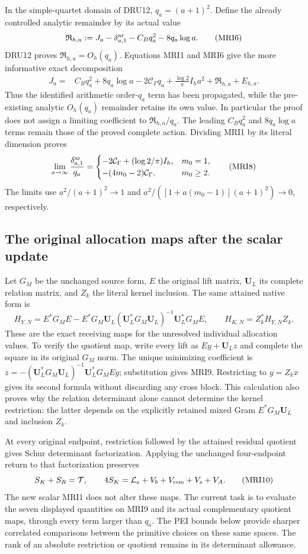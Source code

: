 In the simple-quartet domain of DRU12, $q_a=(a+1)^2$. Define the
already controlled analytic remainder by its actual value
\[
 \mathfrak R_{h,a}:=J_a-\delta_{a,1}^{\rm ar}
                          -C_Bq_a^2-8q_a\log a.
 \tag{MRI6}
\]
DRU12 proves $\mathfrak R_{h,a}=O_h(q_a)$. Equations MRI1 and MRI6
give the more informative exact decomposition
\[
 \begin{split}
 J_a={}&C_Bq_a^2+8q_a\log a-2\mathcal C_\Gamma q_a
        +\frac{\log2}{\pi}I_h a^2+\mathfrak R_{h,a}+E_{h,a}.
 \end{split}\tag{MRI7}
\]
Thus the identified arithmetic order-$q_a$ term has been propagated,
while the pre-existing analytic $O_h(q_a)$ remainder retains its
own value. In particular the proof does not assign a limiting
coefficient to $\mathfrak R_{h,a}/q_a$. The leading $C_Bq_a^2$ and
$8q_a\log a$ terms remain those of the proved complete action.
Dividing MRI1 by its literal dimension proves
\[
 \lim_{a\to\infty}\frac{\delta_{a,1}^{\rm ar}}{q_a}
 =\begin{cases}
 -2\mathcal C_\Gamma+(\log2/\pi)I_h,&m_0=1,\\
 -(4m_0-2)\mathcal C_\Gamma,&m_0\ge2.
 \end{cases}\tag{MRI8}
\]
The limits use $a^2/(a+1)^2\to1$ and
$a^2/([1+a(m_0-1)](a+1)^2)\to0$, respectively.

\subsection{The original allocation maps after the scalar update}
Let $G_M$ be the unchanged source form, $E$ the original lift matrix,
$\mathbf U_L$ its complete relation matrix, and $Z_k$ the literal
kernel inclusion. The same attained native form is
\[
 H_{Y,N}=E^*G_ME-E^*G_M\mathbf U_L
    (\mathbf U_L^*G_M\mathbf U_L)^{-1}\mathbf U_L^*G_ME,
 \qquad H_{K,N}=Z_k^*H_{Y,N}Z_k.
 \tag{MRI9}
\]
These are the exact receiving maps for the unresolved individual
allocation values. To verify the quotient map, write every lift as
$Ey+\mathbf U_Lz$ and complete the square in its original $G_M$
norm. The unique minimizing coefficient is
$z=-(\mathbf U_L^*G_M\mathbf U_L)^{-1}\mathbf U_L^*G_MEy$;
substitution gives MRI9. Restricting to $y=Z_kx$ gives its second
formula without discarding any cross block. This calculation also
proves why the relation determinant alone cannot determine the
kernel restriction: the latter depends on the explicitly retained
mixed Gram $E^*G_M\mathbf U_L$ and inclusion $Z_k$.

At every original endpoint, restriction followed by the attained
residual quotient gives Schur determinant factorization. Applying
the unchanged four-endpoint return to that factorization preserves
\[
 S_K+S_R=\mathcal T,\qquad
 4S_K=\mathcal L_e+V_b+V_{\rm rem}+V_s+V_A.
 \tag{MRI10}
\]
The new scalar MRI1 does not alter these maps. The current task is
to evaluate the seven displayed quantities on MRI9 and its actual
complementary quotient maps, through every term larger than $q_a$.
The PEI bounds below provide sharper correlated comparisons between
the primitive choices on these same spaces. The rank of an absolute
restriction or quotient remains in its determinant allowance.

